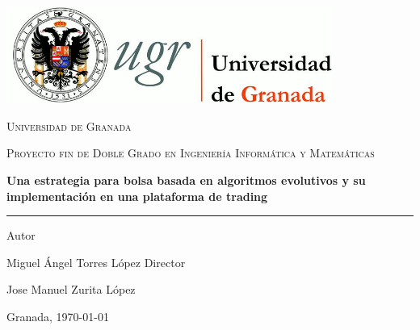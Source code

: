 
	\begin{titlepage}
		\afterpage{\blankpage}
		\centering
		\includegraphics[width=0.8\textwidth]{imagenes/logo_ugr.jpg}\par\vspace{1cm}
		{\scshape\LARGE Universidad de Granada \par}
		\vspace{1cm}
		{\scshape\Large Proyecto fin de Doble Grado en Ingenier\'ia Inform\'atica y Matem\'aticas\par}
		\vspace{1.5cm}
		{\huge\bfseries Una estrategia para bolsa basada en algoritmos evolutivos y su implementaci\'on en una plataforma de trading\par}
		\vspace{0.2cm}
		\noindent\rule{\textwidth}{1pt}
		\vspace{2cm}

		\vfill
		Autor\par
		{\large Miguel \'Angel Torres L\'opez}
		\vfill
		Director\par
		{\large Jose Manuel Zurita L\'opez}
		
		\vfill
		
		{\large Granada, \today\par}
			
	\end{titlepage}
		